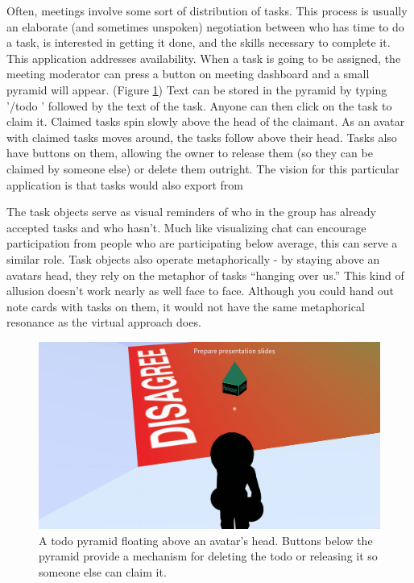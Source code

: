 Often, meetings involve some sort of distribution of tasks. This process is usually an elaborate (and sometimes unspoken) negotiation between who has time to do a task, is interested in getting it done, and the skills necessary to complete it. This application addresses availability. When a task is going to be assigned, the meeting moderator can press a button on meeting dashboard and a small pyramid will appear. (Figure \ref{fig:information_space_todo}) Text can be stored in the pyramid by typing '/todo ' followed by the text of the task. Anyone can then click on the task to claim it. Claimed tasks spin slowly above the head of the claimant. As an avatar with claimed tasks moves around, the tasks follow above their head. Tasks also have buttons on them, allowing the owner to release them (so they can be claimed by someone else) or delete them outright. The vision for this particular application is that tasks would also export from

The task objects serve as visual reminders of who in the group has already accepted tasks and who hasn't. Much like visualizing chat can encourage participation from people who are participating below average, this can serve a similar role. Task objects also operate metaphorically - by staying above an avatars head, they rely on the metaphor of tasks ``hanging over us.'' \citep{lakoff_metaphors_1980} This kind of allusion doesn't work nearly as well face to face. Although you could hand out note cards with tasks on them, it would not have the same metaphorical resonance as the virtual approach does.


\begin{figure}[tp]
	\includegraphics{figures/todo.png}
	\caption{A todo pyramid floating above an avatar's head. Buttons below the pyramid provide a mechanism for deleting the todo or releasing it so someone else can claim it.}
	\label{fig:information_space_todo}
\end{figure}


